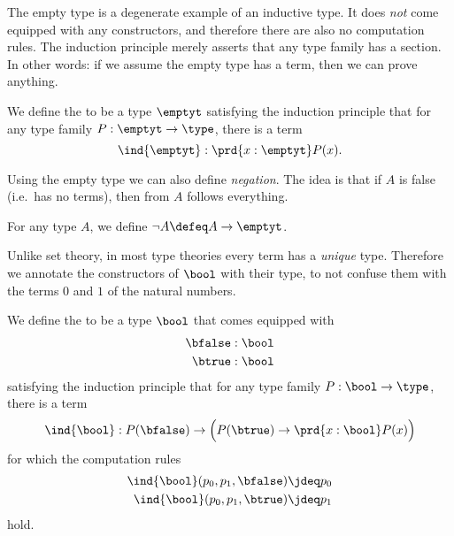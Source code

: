 The empty type is a degenerate example of an inductive type. It does \emph{not} come equipped with any constructors, and therefore there are also no computation rules. The induction principle merely asserts that any type family has a section. In other words: if we assume the empty type has a term, then we can prove anything.

\begin{defn}
We define the  to be a type $\emptyt$ satisfying the induction principle that for any type family $P:\emptyt\to\type$, there is a term
\begin{equation*}
\ind{\emptyt} : \prd{x:\emptyt}P(x).
\end{equation*}
\end{defn}

Using the empty type we can also define \emph{negation}. The idea is that if $A$ is false (i.e.~has no terms), then from $A$ follows everything.

\begin{defn}
For any type $A$, we define $\neg A\defeq A\to \emptyt$.
\end{defn}

Unlike set theory, in most type theories every term has a \emph{unique} type. Therefore we annotate the constructors of $\bool$ with their type, to not confuse them with the terms $0$ and $1$ of the natural numbers.

\begin{defn}
We define the  to be a type $\bool$ that comes equipped with
\begin{align*}
\bfalse & : \bool \\
\btrue & : \bool
\end{align*}
satisfying the induction principle that for any type family $P:\bool\to\type$, there is a term
\begin{equation*}
\ind{\bool} : P(\bfalse)\to \Big(P(\btrue)\to \prd{x:\bool}P(x)\Big)
\end{equation*}
for which the computation rules
\begin{align*}
\ind{\bool}(p_0,p_1,\bfalse) & \jdeq p_0 \\
\ind{\bool}(p_0,p_1,\btrue) & \jdeq p_1
\end{align*}
hold.
\end{defn}

